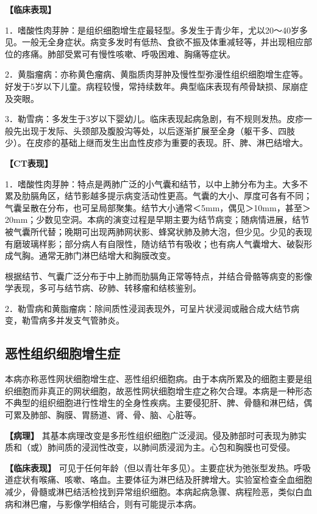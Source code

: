 \textbf{【临床表现】}

1．嗜酸性肉芽肿：是组织细胞增生症最轻型。多发生于青少年，尤以20～40岁多见。一般无全身症状。病变多发时有低热、食欲不振及体重减轻等，并出现相应部位的疼痛。肺部受累可有慢性咳嗽、呼吸困难、胸痛等症状。

2．黄脂瘤病：亦称黄色瘤病、黄脂质肉芽肿及慢性型弥漫性组织细胞增生症等。好发于5岁以下儿童。病程较慢，常持续数年。典型临床表现有颅骨缺损、尿崩症及突眼。

3．勒雪病：多发生于3岁以下婴幼儿。临床表现起病急剧，有不规则发热。皮疹一般先出现于发际、头颈部及腹股沟等处，以后逐渐扩展至全身（躯干多、四肢少）。在皮疹的基础上继而发生出血性皮疹为重要的表现。肝、脾、淋巴结增大。

\textbf{【CT表现】}

1．嗜酸性肉芽肿：特点是两肺广泛的小气囊和结节，以中上肺分布为主。大多不累及肋膈角区，结节影越多提示病变活动性更高。气囊的大小、厚度可各有不同；气囊呈散在分布，也可呈局部聚集。结节大小通常＜5mm，偶见＞10mm，甚至＞20mm；少数见空洞。本病的演变过程是早期主要为结节病变；随病情进展，结节被气囊所代替；晚期可出现两肺网状影、蜂窝状肺及肺大泡，但少见。少见的表现有磨玻璃样影；部分病人有自限性，随访结节有吸收；也有病人气囊增大、破裂形成气胸。通常无肺门淋巴结增大和胸膜改变。

根据结节、气囊广泛分布于中上肺而肋膈角正常等特点，并结合骨骼等病变的影像学表现，多可与结节病、矽肺、转移瘤和结核鉴别。

2．勒雪病和黄脂瘤病：除间质性浸润表现外，可呈片状浸润或融合成大结节病变，勒雪病多并发支气管肺炎。

\subsection{恶性组织细胞增生症}

本病亦称恶性网状细胞增生症、恶性组织细胞病。由于本病所累及的细胞主要是组织细胞而非真正的网状细胞，故恶性网状细胞增生症之称欠合理。本病是一种形态不典型的组织细胞进行性增生的全身性疾病。主要侵犯肝、脾、骨髓和淋巴结，偶可累及肺部、胸膜、胃肠道、肾、骨、脑、心脏等。

\textbf{【病理】}
其基本病理改变是多形性组织细胞广泛浸润。侵及肺部时可表现为肺实质和（或）肺间质的浸润性改变，以肺间质浸润为主。心包和胸膜也可受侵。

\textbf{【临床表现】}
可见于任何年龄（但以青壮年多见）。主要症状为弛张型发热。呼吸道症状有喉痛、咳嗽、咯血。主要体征为淋巴结及肝脾增大。实验室检查全血细胞减少，骨髓或淋巴结活检找到异常组织细胞。本病起病急骤、病程险恶，类似白血病和淋巴瘤，与影像学相结合，则有可能提示本病。

